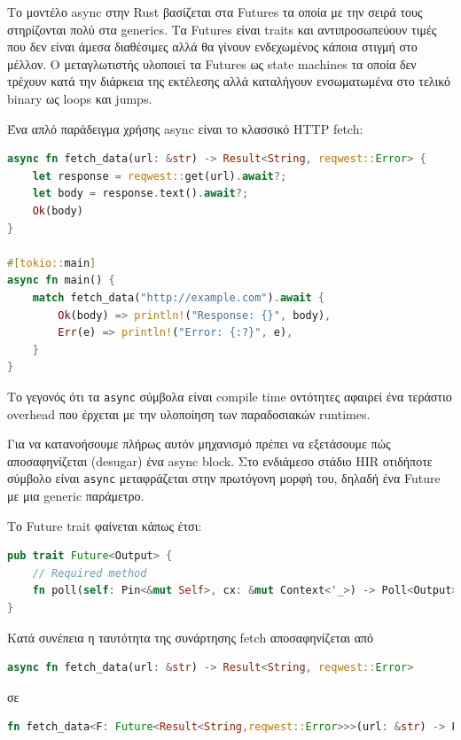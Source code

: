 Το μοντέλο async στην Rust βασίζεται στα Futures τα οποία με την σειρά
τους στηρίζονται πολύ στα generics. Τα Futures είναι traits 
και αντιπροσωπεύουν τιμές που δεν είναι άμεσα διαθέσιμες αλλά θα γίνουν ενδεχωμένος κάποια στιγμή
στο μέλλον. Ο μεταγλωτιστής υλοποιεί τα Futures ως state machines τα οποία δεν τρέχουν κατά
την διάρκεια της εκτέλεσης αλλά καταλήγουν ενσωματωμένα στο τελικό binary ως loops και jumps.

Ένα απλό παράδειγμα χρήσης async είναι το κλασσικό HTTP fetch:

\begin{lstlisting}[language=Rust]
async fn fetch_data(url: &str) -> Result<String, reqwest::Error> {
    let response = reqwest::get(url).await?;
    let body = response.text().await?;
    Ok(body)
}

#[tokio::main]
async fn main() {
    match fetch_data("http://example.com").await {
        Ok(body) => println!("Response: {}", body),
        Err(e) => println!("Error: {:?}", e),
    }
}
\end{lstlisting}

Το γεγονός ότι τα \verb|async| σύμβολα είναι compile time οντότητες αφαιρεί
ένα τεράστιο overhead που έρχεται με την υλοποίηση των παραδοσιακών runtimes.

Για να κατανοήσουμε πλήρως αυτόν μηχανισμό πρέπει να εξετάσουμε πώς αποσαφηνίζεται
(desugar) ένα async block. Στο ενδιάμεσο στάδιο HIR οτιδήποτε σύμβολο είναι \verb|async|
μεταφράζεται στην πρωτόγονη μορφή του, δηλαδή ένα Future με μια generic παράμετρο.

Το Future trait φαίνεται κάπως έτσι:

\begin{lstlisting}[language=Rust]
pub trait Future<Output> {
    // Required method
    fn poll(self: Pin<&mut Self>, cx: &mut Context<'_>) -> Poll<Output>;
}
\end{lstlisting}

Κατά συνέπεια η ταυτότητα της συνάρτησης fetch αποσαφηνίζεται από

\begin{lstlisting}[language=Rust] 
async fn fetch_data(url: &str) -> Result<String, reqwest::Error>
\end{lstlisting}

σε

\begin{lstlisting}[language=Rust] 
fn fetch_data<F: Future<Result<String,reqwest::Error>>>(url: &str) -> F
\end{lstlisting}

